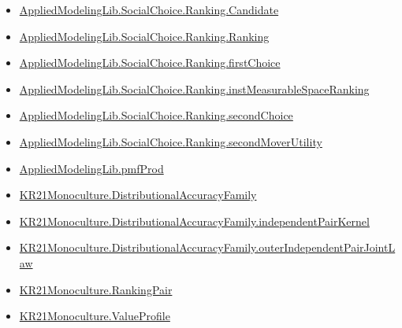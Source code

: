 \documentclass[10pt]{article}
\begin{document}
\begin{itemize}\raggedright
\item \hyperlink{library-prerequisite-8c0e6c25845ae78a}{Applied\allowbreak{}Modeling\allowbreak{}Lib.\allowbreak{}Social\allowbreak{}Choice.\allowbreak{}Ranking.\allowbreak{}Candidate}
\item \hyperlink{library-prerequisite-5cde54446d1ae021}{Applied\allowbreak{}Modeling\allowbreak{}Lib.\allowbreak{}Social\allowbreak{}Choice.\allowbreak{}Ranking.\allowbreak{}Ranking}
\item \hyperlink{governing-declaration-08e457479ee6cf15}{Applied\allowbreak{}Modeling\allowbreak{}Lib.\allowbreak{}Social\allowbreak{}Choice.\allowbreak{}Ranking.\allowbreak{}first\allowbreak{}Choice}
\item \hyperlink{governing-declaration-30ca9c740ef703ec}{Applied\allowbreak{}Modeling\allowbreak{}Lib.\allowbreak{}Social\allowbreak{}Choice.\allowbreak{}Ranking.\allowbreak{}inst\allowbreak{}Measurable\allowbreak{}Space\allowbreak{}Ranking}
\item \hyperlink{governing-declaration-25ac37baf58f31e2}{Applied\allowbreak{}Modeling\allowbreak{}Lib.\allowbreak{}Social\allowbreak{}Choice.\allowbreak{}Ranking.\allowbreak{}second\allowbreak{}Choice}
\item \hyperlink{library-prerequisite-21bd2a45ab961ae4}{Applied\allowbreak{}Modeling\allowbreak{}Lib.\allowbreak{}Social\allowbreak{}Choice.\allowbreak{}Ranking.\allowbreak{}second\allowbreak{}Mover\allowbreak{}Utility}
\item \hyperlink{governing-declaration-de8e2a8bfe221a38}{Applied\allowbreak{}Modeling\allowbreak{}Lib.\allowbreak{}pmf\allowbreak{}Prod}
\item \hyperlink{paper-prerequisite-ee564fa2921e1add}{KR21\allowbreak{}Monoculture.\allowbreak{}Distributional\allowbreak{}Accuracy\allowbreak{}Family}
\item \hyperlink{governing-declaration-6707a8f10749a28d}{KR21\allowbreak{}Monoculture.\allowbreak{}Distributional\allowbreak{}Accuracy\allowbreak{}Family.\allowbreak{}independent\allowbreak{}Pair\allowbreak{}Kernel}
\item \hyperlink{governing-declaration-e6c9a24a5d927c25}{KR21\allowbreak{}Monoculture.\allowbreak{}Distributional\allowbreak{}Accuracy\allowbreak{}Family.\allowbreak{}outer\allowbreak{}Independent\allowbreak{}Pair\allowbreak{}Joint\allowbreak{}Law}
\item \hyperlink{governing-declaration-90a7e19d973f51cb}{KR21\allowbreak{}Monoculture.\allowbreak{}Ranking\allowbreak{}Pair}
\item \hyperlink{paper-prerequisite-c0e41e9b0e843969}{KR21\allowbreak{}Monoculture.\allowbreak{}Value\allowbreak{}Profile}
\end{itemize}
\end{document}
